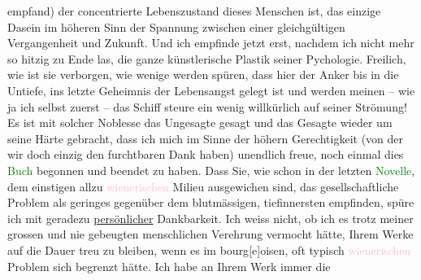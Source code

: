                empfand) der concentrierte Lebenszustand dieses Menschen ist, das einzige Dasein im
               höheren Sinn der Spannung zwischen einer gleichgültigen Vergangenheit und Zukunft.
               Und ich empfinde jetzt erst, nachdem ich nicht mehr so hitzig zu Ende las, die ganze
                  {\pb}künstlerische Plastik seiner
               Pychologie. Freilich, wie ist sie verborgen, wie wenige werden spüren, dass hier der
               Anker bis in die Untiefe, ins letzte Geheimnis der Lebensangst gelegt ist und werden
               meinen – wie ja ich selbst zuerst – das Schiff steure ein wenig willkürlich auf
               seiner Strömung! Es ist mit solcher Noblesse das Ungesagte gesagt und das Gesagte
               wieder um seine Härte gebracht, dass ich mich im Sinne der höhern Gerechtigkeit (von
               der wir doch einzig den furchtbaren Dank haben) unendlich freue, noch einmal dies \textcolor{green}{Buch}\ledrightnote{{$\rightarrow$}\emph{\textcolor{green}{Doktor Gräsler, Badearzt}}} begonnen und beendet zu
               haben. Dass Sie, wie schon in der letzten \textcolor{green}{Novelle}\ledrightnote{{$\rightarrow$}\emph{\textcolor{green}{Frau Beate und ihr Sohn. Novelle}}}, dem einsti{\pb}gen allzu \textcolor{pink}{wienerischen}\ledrightnote{\textcolor{pink}{Wien}} Milieu ausgewichen sind, das gesellschaftliche Problem als
               geringes gegenüber dem blutmässigen, tiefinnersten empfinden, spüre ich mit geradezu
                  \uline{persönlicher} Dankbarkeit. Ich weiss nicht, ob ich
               es trotz meiner grossen und nie gebeugten menschlichen Verehrung vermocht hätte,
               Ihrem Werke auf die Dauer treu zu bleiben, wenn es im
               bourg{[}e{]}oisen, oft typisch \textcolor{pink}{wienerischen}\ledrightnote{\textcolor{pink}{Wien}} Problem sich begrenzt hätte. Ich habe an Ihrem Werk immer die

